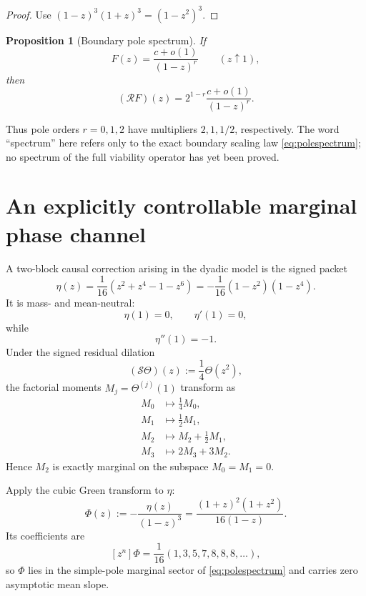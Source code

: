 \documentclass[11pt,a4paper]{article}
\newtheorem{proposition}[theorem]{Proposition}
\theoremstyle{definition}
\theoremstyle{remark}
\newcommand{\cR}{\mathcal R}
\newcommand{\cS}{\mathcal S}
\begin{document}
\begin{proof}
Use \((1-z)^3(1+z)^3=(1-z^2)^3\).
\end{proof}

\begin{proposition}[Boundary pole spectrum]
If
\[
 F(z)=\frac{c+o(1)}{(1-z)^r}
 \qquad(z\uparrow1),
\]
then
\begin{equation}
 \boxed{
 (\cR F)(z)=2^{1-r}\frac{c+o(1)}{(1-z)^r}.
 }
 \label{eq:polespectrum}
\end{equation}
\end{proposition}

Thus pole orders \(r=0,1,2\) have multipliers \(2,1,1/2\), respectively.
The word ``spectrum'' here refers only to the exact boundary scaling law
\eqref{eq:polespectrum}; no spectrum of the full viability operator has yet
been proved.

\section{An explicitly controllable marginal phase channel}
\label{sec:eta}

A two-block causal correction arising in the dyadic model is the signed packet
\begin{equation}
 \boxed{
 \eta(z)=\frac1{16}(z^2+z^4-1-z^6)
 =-\frac1{16}(1-z^2)(1-z^4).
 }
 \label{eq:eta}
\end{equation}
It is mass- and mean-neutral:
\[
 \eta(1)=0,
 \qquad
 \eta'(1)=0,
\]
while
\begin{equation}
 \eta''(1)=-1.
 \label{eq:eta2}
\end{equation}
Under the signed residual dilation
\[
 (\cS\Theta)(z):=\frac14\Theta(z^2),
\]
the factorial moments \(M_j=\Theta^{(j)}(1)\) transform as
\begin{align*}
M_0&\mapsto\frac14M_0,\\
M_1&\mapsto\frac12M_1,\\
M_2&\mapsto M_2+\frac12M_1,\\
M_3&\mapsto2M_3+3M_2.
\end{align*}
Hence \(M_2\) is exactly marginal on the subspace \(M_0=M_1=0\).

Apply the cubic Green transform to \(\eta\):
\begin{equation}
 \boxed{
 \Phi(z):=-\frac{\eta(z)}{(1-z)^3}
 =\frac{(1+z)^2(1+z^2)}{16(1-z)}.
 }
 \label{eq:Phi}
\end{equation}
Its coefficients are
\[
 [z^n]\Phi=\frac1{16}(1,3,5,7,8,8,8,\ldots),
\]
so \(\Phi\) lies in the simple-pole marginal sector of
\eqref{eq:polespectrum} and carries zero asymptotic mean slope.
\end{document}
